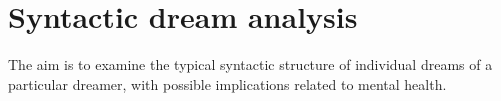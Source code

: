 \documentclass[xcolor=x11names,compress]{beamer}
\begin{document}
\section{Syntactic dream analysis}
{
\begin{frame}[c]{}
    \begin{minipage}{\textwidth} \centering
    {\LARGE {\color{redUnicam}{Syntactic analysis of dreams}}}
    \end{minipage}
    \newline \newline
    \begin{minipage}{\textwidth}
    \centering
    {The aim is to examine the typical syntactic structure of individual dreams of a particular dreamer,
    with possible implications related to mental health.}
    \end{minipage}
\end{frame}}
\end{document}
